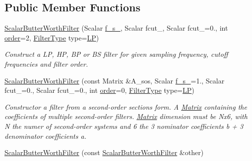 \subsection*{Public Member Functions}
\begin{DoxyCompactItemize}
\item 
\hyperlink{classow__core_1_1ScalarButterWorthFilter_abdf8c3fa60b7361595fa628d2b02c851}{Scalar\+Butter\+Worth\+Filter} (Scalar \hyperlink{classow__core_1_1ScalarButterWorthFilter_a606b9f4260cb272a5f49adc5fe548d93}{f\+\_\+s\+\_\+}, Scalar fcut\+\_, Scalar fcut\+\_=0., int \hyperlink{classow__core_1_1ScalarButterWorthFilter_a9bc80a1619931505c290bdb8dae15aba}{order}=2, \hyperlink{classow__core_1_1ScalarButterWorthFilter_aa2ad57d5d67aa7bb2310a52d6e35c0af}{Filter\+Type} type=\hyperlink{classow__core_1_1ScalarButterWorthFilter_aa2ad57d5d67aa7bb2310a52d6e35c0afa47394b33f3175a7d46009fd0ad40ff09}{LP})
\begin{DoxyCompactList}\small\item\em Construct a LP, HP, BP or BS filter for given sampling frequency, cutoff frequencies and filter order. \end{DoxyCompactList}\item 
\hyperlink{classow__core_1_1ScalarButterWorthFilter_a95fc83411c5b6081b615d2903845f4a7}{Scalar\+Butter\+Worth\+Filter} (const Matrix \&A\+\_\+sos, Scalar \hyperlink{classow__core_1_1ScalarButterWorthFilter_a606b9f4260cb272a5f49adc5fe548d93}{f\+\_\+s\+\_\+}=1., Scalar fcut\+\_=0., Scalar fcut\+\_=0., int \hyperlink{classow__core_1_1ScalarButterWorthFilter_a9bc80a1619931505c290bdb8dae15aba}{order}=0, \hyperlink{classow__core_1_1ScalarButterWorthFilter_aa2ad57d5d67aa7bb2310a52d6e35c0af}{Filter\+Type} type=\hyperlink{classow__core_1_1ScalarButterWorthFilter_aa2ad57d5d67aa7bb2310a52d6e35c0afa47394b33f3175a7d46009fd0ad40ff09}{LP})
\begin{DoxyCompactList}\small\item\em Constructor a filter from a second-\/order sections form. A \hyperlink{classow__core_1_1Matrix}{Matrix} containing the coefficients of multiple second-\/order filters. \hyperlink{classow__core_1_1Matrix}{Matrix} dimension must be Nx6, with N the numer of second-\/order systems and 6 the 3 nominator coefficients b + 3 denominator coefficients a. \end{DoxyCompactList}\item 
\hyperlink{classow__core_1_1ScalarButterWorthFilter_a80aebb51b2a662ccad3830271d1c5b20}{Scalar\+Butter\+Worth\+Filter} (const \hyperlink{classow__core_1_1ScalarButterWorthFilter}{Scalar\+Butter\+Worth\+Filter} \&other)\hypertarget{classow__core_1_1ScalarButterWorthFilter_a80aebb51b2a662ccad3830271d1c5b20}{}\label{classow__core_1_1ScalarButterWorthFilter_a80aebb51b2a662ccad3830271d1c5b20}


\end{DoxyCompactItemize}
